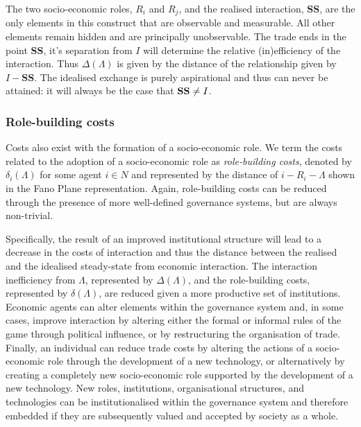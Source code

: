 The two socio-economic roles, $R_{i}$ and $R_{j}$, and the realised interaction, \textbf{SS}, are the only elements in this construct that are observable and measurable. All other elements remain hidden and are principally unobservable. The trade ends in the point \textbf{SS}, it's separation from $I$ will determine the relative (in)efficiency of the interaction. Thus $\Delta(\Lambda)$ is given by the distance of the relationship given by $I-\mathbf{SS}$. The idealised exchange is purely aspirational and thus can never be attained: it will always be the case that $\mbox{\textbf{SS}} \neq I$.

\subsubsection{Role-building costs}

Costs also exist with the formation of a socio-economic role. We term the costs related to the adoption of a socio-economic role as \emph{role-building costs}, denoted by $\delta_{i}(\Lambda)$ for some agent $i \in N$ and represented by the distance of $i-R_{i}-\Lambda$ shown in the Fano Plane representation. Again, role-building costs can be reduced through the presence of more well-defined governance systems, but are always non-trivial.

Specifically, the result of an improved institutional structure will lead to a decrease in the costs of interaction and thus the distance between the realised and the idealised steady-state from economic interaction. The interaction inefficiency from $\Lambda$, represented by $\Delta(\Lambda)$, and the role-building costs, represented by $\delta(\Lambda)$, are reduced given a more productive set of institutions. Economic agents can alter elements within the governance system and, in some cases, improve interaction by altering either the formal or informal rules of the game through political influence, or by restructuring the organisation of trade. Finally, an individual can reduce trade costs by altering the actions of a socio-economic role through the development of a new technology, or alternatively by creating a completely new socio-economic role supported by the development of a new technology. New roles, institutions, organisational structures, and technologies can be institutionalised within the governance system and therefore embedded if they are subsequently valued and accepted by society as a whole.

